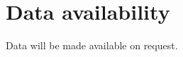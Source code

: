 \documentclass[a4paper,fleqn]{cas-sc}
\begin{document}
\section*{Data availability}
Data will be made available on request.


\printcredits



%



%
\end{document}
